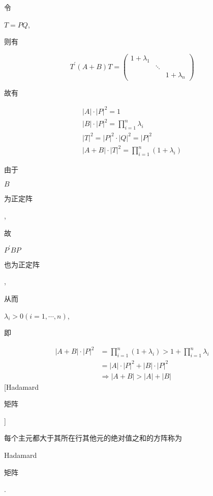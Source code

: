 \documentclass[10pt]{article}
\begin{document}
\begin{CJK}{UTF8}{mj}令\end{CJK} $T=P Q$, \begin{CJK}{UTF8}{mj}则有\end{CJK}
$$
T^{\prime}(A+B) T=\left(\begin{array}{ccc}
1+\lambda_{1} & & \\
& \ddots & \\
& & 1+\lambda_{n}
\end{array}\right)
$$
\begin{CJK}{UTF8}{mj}故有\end{CJK}
$$
\begin{gathered}
|A| \cdot|P|^{2}=1 \\
|B| \cdot|P|^{2}=\prod_{i=1}^{n} \lambda_{i} \\
|T|^{2}=|P|^{2} \cdot|Q|^{2}=|P|^{2} \\
|A+B| \cdot|T|^{2}=\prod_{i=1}^{n}\left(1+\lambda_{i}\right)
\end{gathered}
$$
\begin{CJK}{UTF8}{mj}由于\end{CJK} $B$ \begin{CJK}{UTF8}{mj}为正定阵\end{CJK}, \begin{CJK}{UTF8}{mj}故\end{CJK} $P^{\prime} B P$ \begin{CJK}{UTF8}{mj}也为正定阵\end{CJK}, \begin{CJK}{UTF8}{mj}从而\end{CJK} $\lambda_{i}>0(i=1, \cdots, n)$, \begin{CJK}{UTF8}{mj}即\end{CJK}
$$
\begin{aligned}
|A+B| \cdot|P|^{2} &=\prod_{i=1}^{n}\left(1+\lambda_{i}\right)>1+\prod_{i=1}^{n} \lambda_{i} \\
&=|A| \cdot|P|^{2}+|B| \cdot|P|^{2} \\
& \Rightarrow|A+B|>|A|+|B|
\end{aligned}
$$
[Hadamard \begin{CJK}{UTF8}{mj}矩阵\end{CJK}] \begin{CJK}{UTF8}{mj}每个主元都大于其所在行其他元的绝对值之和的方阵称为\end{CJK} Hadamard \begin{CJK}{UTF8}{mj}矩阵\end{CJK}.
\end{document}

